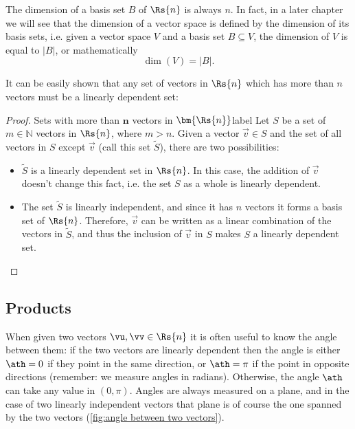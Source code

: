 The dimension of a basis set $B$ of $\Rs{n}$ is always $n$. In fact, in a later chapter we will see that the dimension of a vector space is defined by the dimension of its basis sets, i.e. given a vector space $V$ and a basis set $B\subseteq V$, the dimension of $V$ is equal to $|B|$, or mathematically
\begin{equation}
	\dim(V) = |B|.
	\label{eq:dimension of a vector space}
\end{equation}

It can be easily shown that any set of vectors in $\Rs{n}$ which has more than $n$ vectors must be a linearly dependent set:

\begin{proof}{Sets with more than $\bm{n}$ vectors in $\bm{\Rs{n}}$}{label}
	Let $S$ be a set of $m\in\mathbb{N}$ vectors in $\Rs{n}$, where $m>n$. Given a vector $\vec{v}\in S$ and the set of all vectors in $S$ except $\vec{v}$ (call this set $\tilde{S}$), there are two possibilities:
	\begin{itemize}
		\item $\tilde{S}$ is a linearly dependent set in $\Rs{n}$. In this case, the addition of $\vec{v}$ doesn't change this fact, i.e. the set $S$ as a whole is linearly dependent.
		\item The set $\tilde{S}$ is linearly independent, and since it has $n$ vectors it forms a basis set of $\Rs{n}$. Therefore, $\vec{v}$ can be written as a linear combination of the vectors in $\tilde{S}$, and thus the inclusion of $\vec{v}$ in $S$ makes $S$ a linearly dependent set.
	\end{itemize}
\end{proof}

\Blindtext

\subsection{Products}
When given two vectors $\vu,\vv\in\Rs{n}$ it is often useful to know the angle between them: if the two vectors are linearly dependent then the angle is either $\ath=0$ if they point in the same direction, or $\ath=\pi$ if the point in opposite directions (remember: we measure angles in radians). Otherwise, the angle $\ath$ can take any value in $(0,\pi)$. Angles are always measured on a plane, and in the case of two linearly independent vectors that plane is of course the one spanned by the two vectors (\autoref{fig:angle between two vectors}).

